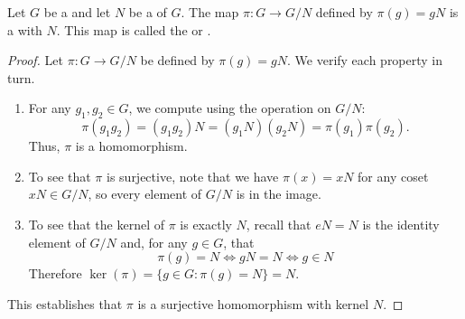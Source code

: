 \begin{theorem} \label{theorem:canonical_projection_from_group_to_quotient_by_normal_subgroup}
    Let $G$ be a  and let $N$ be a  of $G$. The map $\pi : G \to G/N$ defined by $\pi(g) = gN$ is a   with  $N$. This map is called the  or .
\end{theorem}
\begin{proof}
    Let $\pi : G \to G/N$ be defined by $\pi(g) = gN$. We verify each property in turn.

    \begin{enumerate}
        \item For any $g_1, g_2 \in G$, we compute using the operation on $G/N$:
        $$\pi(g_1 g_2) = (g_1 g_2)N = (g_1 N)(g_2 N) = \pi(g_1)\pi(g_2).$$
        Thus, $\pi$ is a homomorphism.

        \item To see that $\pi$ is surjective, note that we have $\pi(x) = xN$ for any coset $xN \in G/N$, so every element of $G/N$ is in the image.

        \item To see that the kernel of $\pi$ is exactly $N$, recall that $eN = N$ is the identity element of $G/N$ and, for any $g \in G$,  that
        $$\pi(g) = N \iff gN = N \iff g \in N$$
        Therefore $\operatorname{ker}(\pi) = \{g \in G : \pi(g) = N\} = N$.
    \end{enumerate}
    This establishes that $\pi$ is a surjective homomorphism with kernel $N$.
\end{proof}

